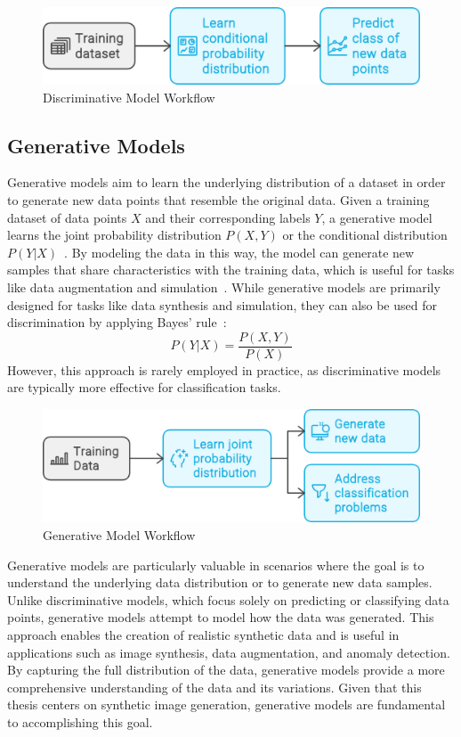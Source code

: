 \documentclass[12pt,DIV14,BCOR12mm,a4paper,footinclude=false,headinclude,parskip=half-,twoside,openright,cleardoublepage=empty,toc=index,bibliography=totoc,listof=totoc]{scrreprt}
\numberwithin{equation}{chapter}
\begin{document}
\begin{figure}
	\centering
	\includegraphics[scale=.3]{../media/Discriminative_model.png}
	\caption{Discriminative Model Workflow~\cite{Nanda:2024}}
	\label{disc}
\end{figure}

\subsection{Generative Models}
Generative models aim to learn the underlying distribution of a dataset in order to generate new data points that resemble the original data. Given a training dataset of data points \( X \) and their corresponding labels \( Y \), a generative model learns the joint probability distribution \( P(X, Y) \) or the conditional distribution \( P(Y|X) \)~\cite{deng2016deep}. By modeling the data in this way, the model can generate new samples that share characteristics with the training data, which is useful for tasks like data augmentation and simulation~\cite{zheng2023toward}. While generative models are primarily designed for tasks like data synthesis and simulation, they can also be used for discrimination by applying Bayes’ rule~\cite{ng2001discriminative}: 
\begin{equation}
P(Y|X) = \frac{P(X, Y)}{P(X)}
\end{equation}
However, this approach is rarely employed in practice, as discriminative models are typically more effective for classification tasks.
\begin{figure}
	\centering
	\includegraphics[scale=.3]{../media/Generative Model.png}
	\caption{Generative Model Workflow\cite{Nanda:2024}}
	\label{gen}
\end{figure}
Generative models are particularly valuable in scenarios where the goal is to understand the underlying data distribution or to generate new data samples. Unlike discriminative models, which focus solely on predicting or classifying data points, generative models attempt to model how the data was generated. This approach enables the creation of realistic synthetic data and is useful in applications such as image synthesis, data augmentation, and anomaly detection. By capturing the full distribution of the data, generative models provide a more comprehensive understanding of the data and its variations. Given that this thesis centers on synthetic image generation, generative models are fundamental to accomplishing this goal.
\end{document}
